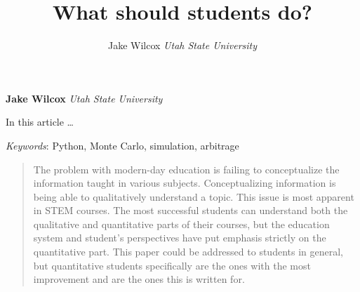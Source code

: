 \documentclass[11pt,]{article}
\title{What should students do?  }
\author{\Large Jake Wilcox\vspace{0.05in} \newline\normalsize\emph{Utah State University}  }
\date{}
\newcommand*{\authorfont}{\fontfamily{phv}\selectfont}
\renewenvironment{abstract}
 {{%
    \setlength{\leftmargin}{0mm}
    \setlength{\rightmargin}{\leftmargin}%
  }%
  \relax}
 {\endlist}
\begin{document}
	
%

{%
\setlength{\parindent}{0pt}
\thispagestyle{plain}
{\fontsize{18}{20}\selectfont\raggedright 
\maketitle  %

}

{
   \vskip 13.5pt\relax \normalsize\fontsize{11}{12} 
\textbf{\authorfont Jake Wilcox} \hskip 15pt \emph{\small Utah State University}   

}

}







\begin{abstract}

    \hbox{\vrule height .2pt width 39.14pc}

    \vskip 8.5pt %

\noindent In this article \ldots{}


\vskip 8.5pt \noindent \emph{Keywords}: Python, Monte Carlo, simulation, arbitrage \par

    \hbox{\vrule height .2pt width 39.14pc}



\end{abstract}


\vskip 6.5pt

\noindent \doublespacing \begin{quote}
The problem with modern-day education is failing to conceptualize the
information taught in various subjects. Conceptualizing information is
being able to qualitatively understand a topic. This issue is most
apparent in STEM courses. The most successful students can understand
both the qualitative and quantitative parts of their courses, but the
education system and student's perspectives have put emphasis strictly
on the quantitative part. This paper could be addressed to students in
general, but quantitative students specifically are the ones with the
most improvement and are the ones this is written for.
\end{quote}
\end{document}
